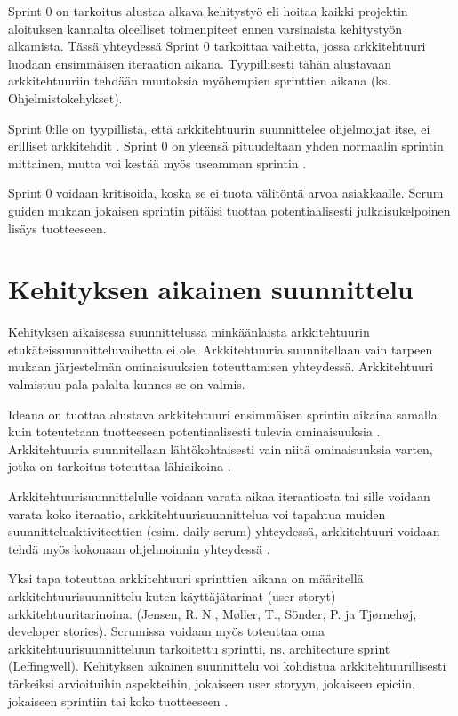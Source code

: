 Sprint 0 on tarkoitus alustaa alkava kehitystyö eli hoitaa kaikki projektin aloituksen kannalta oleelliset toimenpiteet ennen varsinaista kehitystyön alkamista. Tässä yhteydessä Sprint 0 tarkoittaa vaihetta, jossa arkkitehtuuri luodaan ensimmäisen iteraation aikana. Tyypillisesti tähän alustavaan arkkitehtuuriin tehdään muutoksia myöhempien sprinttien aikana (ks. Ohjelmistokehykset). 

Sprint 0:lle on tyypillistä, että arkkitehtuurin suunnittelee ohjelmoijat itse, ei erilliset arkkitehdit \citep{eloranta2015techniques}. Sprint 0 on yleensä pituudeltaan yhden normaalin sprintin mittainen, mutta voi kestää myös useamman sprintin \citep{prause_architectural_2012}.

Sprint 0 voidaan kritisoida, koska se ei tuota välitöntä arvoa asiakkaalle.
Scrum guiden mukaan jokaisen sprintin pitäisi tuottaa potentiaalisesti julkaisukelpoinen lisäys tuotteeseen.

\section{Kehityksen aikainen suunnittelu}
Kehityksen aikaisessa suunnittelussa minkäänlaista arkkitehtuurin etukäteissuunnitteluvaihetta ei ole. Arkkitehtuuria suunnitellaan vain tarpeen mukaan järjestelmän ominaisuuksien toteuttamisen yhteydessä. Arkkitehtuuri valmistuu pala palalta kunnes se on valmis.

Ideana on tuottaa alustava arkkitehtuuri ensimmäisen sprintin aikaina samalla kuin toteutetaan tuotteeseen potentiaalisesti tulevia ominaisuuksia \citep{eloranta2015techniques}. Arkkitehtuuria suunnitellaan lähtökohtaisesti vain niitä ominaisuuksia varten, jotka on tarkoitus toteuttaa lähiaikoina \citep{waterman_how_2015}. 

Arkkitehtuurisuunnittelulle voidaan varata aikaa iteraatiosta tai sille voidaan varata koko iteraatio, arkkitehtuurisuunnittelua voi tapahtua muiden suunnitteluaktiviteettien (esim. daily scrum) yhteydessä, arkkitehtuuri voidaan tehdä myös kokonaan ohjelmoinnin yhteydessä \citep{rost_distilling_2015}. 

Yksi tapa toteuttaa arkkitehtuuri sprinttien aikana on määritellä arkkitehtuurisuunnittelu kuten käyttäjätarinat (user storyt) arkkitehtuuritarinoina. (Jensen, R. N., Møller, T., Sönder, P. ja Tjørnehøj, developer stories). Scrumissa voidaan myös toteuttaa oma arkkitehtuurisuunnitteluun tarkoitettu sprintti, ns. architecture sprint (Leffingwell). Kehityksen aikainen suunnittelu voi kohdistua arkkitehtuurillisesti tärkeiksi arvioituihin  aspekteihin, jokaiseen user storyyn, jokaiseen epiciin, jokaiseen sprintiin tai koko tuotteeseen \citep{rost_distilling_2015}.

